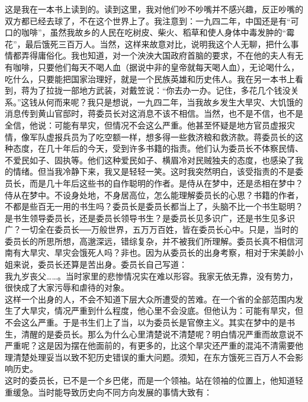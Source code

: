 这是我在一本书上读到的。读到这里，我对他们吵不吵嘴并不感兴趣，反正吵嘴的双方都已经去球了，不在这个世界上了。我注意到：一九四二年，中国还是有“可口的咖啡”，虽然我故乡的人民在吃树皮、柴火、稻草和使人身体中毒发肿的“霉花”，最后饿死三百万人。当然，这样来故意对比，说明我这个人无聊，把什么事情都弄得庸俗化。我也知道，对一个泱泱大国政府首脑的要求，不在他的夫人有无有咖啡，只要他们每天不喝人血（据说中非的皇帝就每天喝人血），无论喝什么，吃什么，只要能把国家治理好，就是一个民族英雄和历史伟人。我在另一本书上看到，蒋为了拉拢一部地方武装，对戴笠说：“你去办一办。记住，多花几个钱没关系。”这钱从何而来呢？我只是想说，一九四二年，当我故乡发生大旱灾、大饥饿的消息传到黄山官邸时，蒋委员长对这消息不该不相信。当然，也不是不信，也不是全信，他说：可能有旱灾，但情况不会这么严重。他甚至怀疑是地方官员虚报灾情，像军队虚报兵员为了吃空额一样，想多得一些救济粮和救济款。蒋委员长的这种态度，在几十年后的今天，受到许多书籍的指责。他们认为委员长不体察民情、不爱民如子、固执等。他们这种爱民如子、横眉冷对民贼独夫的态度，也感染了我的情绪。但当我冷静下来，我又是轻轻一笑。这时我突然明白，该受指责的不是委员长，而是几十年后这些书的自作聪明的作者。是侍从在梦中，还是丞相在梦中？侍从在梦中。不设身处地，不身居高位，怎么能理解委员长的心思？书籍的作者，不都是些百无一用的书生吗？委员长是委员长都当上了，头脑不比一个书生聪明？是书生领导委员长，还是委员长领导书生？是委员长见多识广，还是书生见多识广？一切全在委员长{\Add ──}万般世界，五万万百姓，皆在委员长心中。只是，当时的委员长的所思所想，高邈深远，错综复杂，并不被我们所理解。委员长真不相信河南有大旱灾、旱灾会饿死人吗？非也。因为从委员长的出身考察，相对于宋美龄小姐来说，委员长还算是苦出身。委员长自己写道：\\

我九岁丧父……。当时家里的悲惨情况实在难以形容。我家无依无靠，没有势力，很快成了大家污辱和虐待的对象。\\

这样一个出身的人，不会不知道下层大众所遭受的苦难。在一个省的全部范围内发生了大旱灾，情况严重到什么程度，他心里不会没底。但他认为：可能有旱灾，但不会这么严重。于是书生们上了当，以为委员长是官僚主义。其实在梦中的是书生，清醒的是委员长。那么为什么心里清楚说不清楚呢？明白情况严重而故意说不严重呢？这是因为摆在他面前的，有更多的，比这个旱灾还严重的混沌不清需要他理清楚处理妥当以致不犯历史错误的重大问题。须知，在东方饿死三百万人不会影响历史。\\

这时的委员长，已不是一个乡巴佬，而是一个领袖。站在领袖的位置上，他知道轻重缓急。当时能导致历史向不同方向发展的事情大致有：\\

